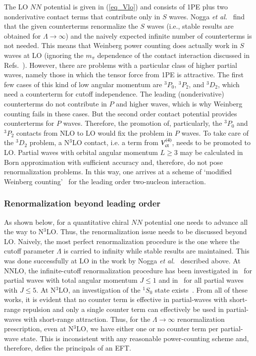 \documentclass[sort&compress,preprint,3p]{elsarticle}
\begin{document}
The LO $NN$ potential is given in (\ref{eq_Vlo}) and consists
of 1PE plus two nonderivative contact terms that contribute
only in $S$ waves.
Nogga {\it et al.}~\cite{NTK05} find that the given counterterms renormalize
the $S$ waves (i.e., stable results are obtained for $\Lambda \rightarrow \infty$) and
the naively expected infinite number of counterterms
is not needed. This means that Weinberg power counting does actually work in
$S$ waves at LO (ignoring the $m_\pi$ dependence of the contact interaction
discussed in Refs.~\cite{KSW96,Bea02}).
However, there are problems with a particular class of higher partial waves,
namely those  
in which the tensor force from 1PE is attractive. The first few cases
of this kind  of low angular momentum are
$^3P_0$, $^3P_2$, and $^3D_2$, which need a counterterm for cutoff independence. 
The leading (nonderivative) counterterms do not contribute in
$P$ and higher waves, which is why Weinberg counting fails in these cases. 
But the second order contact potential provides counterterms
for $P$ waves. Therefore, the promotion
of, particularly, the $^3P_0$ and $^3P_2$ contacts from NLO to LO would
fix the problem in $P$ waves. To take care of the $^3D_2$ problem,
a N$^3$LO contact, i.e. a term from $V^{(4)}_{\rm ct}$, needs to be promoted to LO.
Partial waves with orbital angular momentum $L\geq 3$ may be calculated in Born
approximation with sufficient accuracy and, therefore, do not pose renormalization
problems.
In this way, one arrives at a scheme
of `modified Weinberg counting'~\cite{NTK05} for the leading order 
two-nucleon interaction.

\subsubsection{Renormalization beyond leading order}

As shown below, for a quantitative chiral $NN$ potential one needs to advance all the way
to N$^3$LO. Thus, the renormalization issue needs to be discussed beyond LO.
Naively, the most perfect renormalization procedure is the one where the cutoff
parameter $\Lambda$ is carried to infinity while stable results are maintained.
This was done successfully at LO in the work by Nogga {\it et al.}~\cite{NTK05} described above.
At NNLO, the infinite-cutoff renormalization procedure has been investigated 
in~\cite{YEP07} for partial waves with total angular momentum $J\leq 1$ and
in~\cite{VA07} for all partial waves with $J\leq 5$. At N$^3$LO, an investigation
of the $^1S_0$ state exists~\cite{Ent08}.
From all of these works, it is evident that no counter term is effective in partial-waves with
short-range repulsion and only a single counter term can effectively be used in
partial-waves with short-range attraction. Thus, for the $\Lambda \rightarrow \infty$
renormalization prescription, even at N$^3$LO, we have either one or no counter term
per partial-wave state. This is inconsistent with any reasonable power-counting scheme
and, therefore, defies the principals of an EFT.
\end{document}
